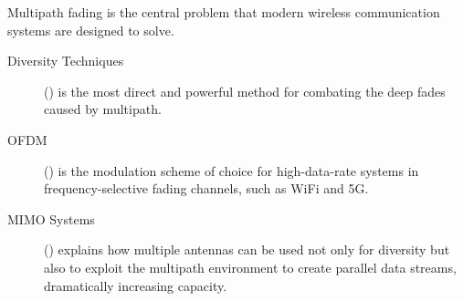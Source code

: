 \begin{importantbox}[title={Further Reading}]
    Multipath fading is the central problem that modern wireless communication systems are designed to solve.
    \begin{description}
        \item[Diversity Techniques] () is the most direct and powerful method for combating the deep fades caused by multipath.
        \item[OFDM] () is the modulation scheme of choice for high-data-rate systems in frequency-selective fading channels, such as WiFi and 5G.
        \item[MIMO Systems] () explains how multiple antennas can be used not only for diversity but also to exploit the multipath environment to create parallel data streams, dramatically increasing capacity.
    \end{description}
\end{importantbox}
